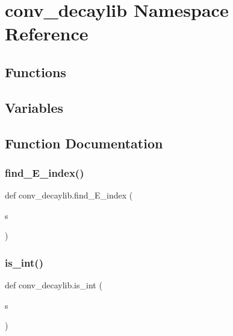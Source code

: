 \hypertarget{namespaceconv__decaylib}{}\section{conv\+\_\+decaylib Namespace Reference}
\label{namespaceconv__decaylib}
\subsection*{Functions}
\subsection*{Variables}


\subsection{Function Documentation}
\mbox{\label{namespaceconv__decaylib_a31ae3d7707e0cca60003416efdf39a14}} 
\subsubsection{\texorpdfstring{find\+\_\+\+E\+\_\+index()}{find\_E\_index()}}
{\footnotesize\ttfamily def conv\+\_\+decaylib.\+find\+\_\+\+E\+\_\+index (\begin{DoxyParamCaption}\item[{}]{s }\end{DoxyParamCaption})}

\mbox{\label{namespaceconv__decaylib_a9258bbd75917abd8752e84b35ffcab3b}} 
\subsubsection{\texorpdfstring{is\+\_\+int()}{is\_int()}}
{\footnotesize\ttfamily def conv\+\_\+decaylib.\+is\+\_\+int (\begin{DoxyParamCaption}\item[{}]{s }\end{DoxyParamCaption})}

